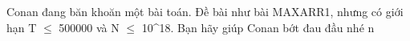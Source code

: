 Conan đang băn khoăn một bài toán. Đề bài như bài MAXARR1, nhưng có giới hạn T  $\le$  500000 và N  $\le$  10^18. Bạn hãy giúp Conan bớt đau đầu nhé ^^.  

\